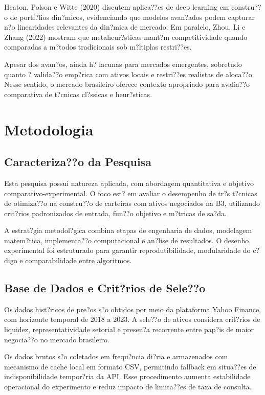 ﻿\documentclass[
  12pt,
  oneside,
  a4paper,
  brazil
]{abntex2}
\begin{document}
Heaton, Polson e Witte (2020) discutem aplica??es de deep learning em constru??o de portf?lios din?micos, evidenciando que modelos avan?ados podem capturar n?o linearidades relevantes da din?mica de mercado. Em paralelo, Zhou, Li e Zhang (2022) mostram que metaheur?sticas mant?m competitividade quando comparadas a m?todos tradicionais sob m?ltiplas restri??es.

Apesar dos avan?os, ainda h? lacunas para mercados emergentes, sobretudo quanto ? valida??o emp?rica com ativos locais e restri??es realistas de aloca??o. Nesse sentido, o mercado brasileiro oferece contexto apropriado para avalia??o comparativa de t?cnicas cl?ssicas e heur?sticas.

\chapter{Metodologia}
\section{Caracteriza??o da Pesquisa}
Esta pesquisa possui natureza aplicada, com abordagem quantitativa e objetivo comparativo-experimental. O foco est? em avaliar o desempenho de tr?s t?cnicas de otimiza??o na constru??o de carteiras com ativos negociados na B3, utilizando crit?rios padronizados de entrada, fun??o objetivo e m?tricas de sa?da.

A estrat?gia metodol?gica combina etapas de engenharia de dados, modelagem matem?tica, implementa??o computacional e an?lise de resultados. O desenho experimental foi estruturado para garantir reprodutibilidade, modularidade do c?digo e comparabilidade entre algoritmos.

\section{Base de Dados e Crit?rios de Sele??o}
Os dados hist?ricos de pre?os s?o obtidos por meio da plataforma Yahoo Finance, com horizonte temporal de 2018 a 2023. A sele??o de ativos considera crit?rios de liquidez, representatividade setorial e presen?a recorrente entre pap?is de maior negocia??o no mercado brasileiro.

Os dados brutos s?o coletados em frequ?ncia di?ria e armazenados com mecanismo de cache local em formato CSV, permitindo fallback em situa??es de indisponibilidade tempor?ria da API. Esse procedimento aumenta estabilidade operacional do experimento e reduz impacto de limita??es de taxa de consulta.
\end{document}
